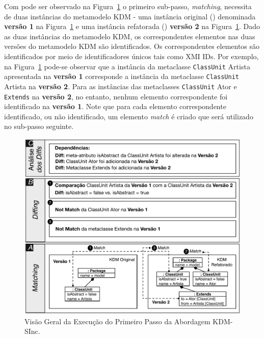 Com pode ser observado na Figura~\ref{fig:diff_emf_compare} o primeiro sub-passo, \textit{matching}, necessita de duas instâncias do metamodelo KDM - uma instância original () denominada \textbf{versão 1} na Figura~\ref{fig:diff_emf_compare} e uma instância refatorada () \textbf{versão 2} na Figura~\ref{fig:diff_emf_compare}. Dado as duas instâncias do metamodelo KDM, os correspondentes elementos nas duas versões do metamodelo KDM são identificados. Os correspondentes elementos são identificados por meio de identificadores únicos tais como XMI IDs. Por exemplo, na Figura~\ref{fig:diff_emf_compare} pode-se observar que a instância da metaclasse \texttt{ClassUnit} Artista apresentada na \textbf{versão 1} corresponde a instância da metaclasse \texttt{ClassUnit} Artista na \textbf{versão 2}. Para as instâncias das metaclasses \texttt{ClassUnit} Ator e \texttt{Extends} na \textbf{versão 2}, no entanto, nenhum elemento correspondente foi identificado na \textbf{versão 1}. Note que para cada elemento correspondente identificado, ou não identificado, um elemento \textit{match} é criado que será utilizado no sub-passo seguinte.

\begin{figure}[h]
	\centering
	\caption{Visão Geral da Execução do Primeiro Passo da Abordagem KDM-SInc.}
	\label{fig:diff_emf_compare}
	\includegraphics[scale=0.8]{images/matching_diffing_analise_3}
	\fautor
\end{figure}


